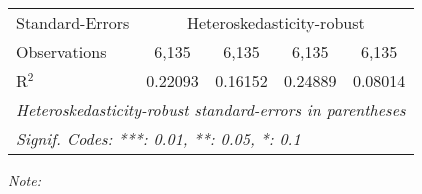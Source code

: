 \begin{table}[htbp!]
\begin{adjustbox}{width = 1\textwidth, max height = 0.95\textheight, center}
\begin{threeparttable}[b]
\begin{tabular}{lcccc}
            \midrule 
            Standard-Errors & \multicolumn{4}{c}{Heteroskedasticity-robust} \\ 
            Observations         & 6,135                          & 6,135                          & 6,135                          & 6,135\\  
            R$^2$                & 0.22093                        & 0.16152                        & 0.24889                        & 0.08014\\  
            \midrule \midrule
            \multicolumn{5}{l}{\emph{Heteroskedasticity-robust standard-errors in parentheses}}\\
            \multicolumn{5}{l}{\emph{Signif. Codes: ***: 0.01, **: 0.05, *: 0.1}}\\
         \end{tabular}
         
         \begin{tablenotes}\item \medskip \textit{Note:}
         \end{tablenotes}
      \end{threeparttable}
   \end{adjustbox}
\end{table}


